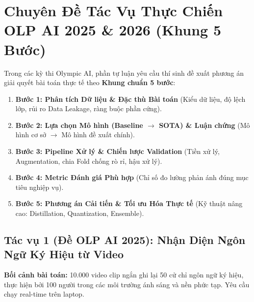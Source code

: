 \documentclass[10pt,a4paper]{article}
\begin{document}
\section{Chuyên Đề Tác Vụ Thực Chiến OLP AI 2025 \& 2026 (Khung 5 Bước)}

Trong các kỳ thi Olympic AI, phần tự luận yêu cầu thí sinh đề xuất phương án giải quyết bài toán thực tế theo \textbf{Khung chuẩn 5 bước}:
\begin{enumerate}[leftmargin=*]
    \item \textbf{Bước 1: Phân tích Dữ liệu \& Đặc thù Bài toán} (Kiểu dữ liệu, độ lệch lớp, rủi ro Data Leakage, ràng buộc phần cứng).
    \item \textbf{Bước 2: Lựa chọn Mô hình (Baseline $\to$ SOTA) \& Luận chứng} (Mô hình cơ sở $\to$ Mô hình đề xuất chính).
    \item \textbf{Bước 3: Pipeline Xử lý \& Chiến lược Validation} (Tiền xử lý, Augmentation, chia Fold chống rò rỉ, hậu xử lý).
    \item \textbf{Bước 4: Metric Đánh giá Phù hợp} (Chỉ số đo lường phản ánh đúng mục tiêu nghiệp vụ).
    \item \textbf{Bước 5: Phương án Cải tiến \& Tối ưu Hóa Thực tế} (Kỹ thuật nâng cao: Distillation, Quantization, Ensemble).
\end{enumerate}

\subsection{Tác vụ 1 (Đề OLP AI 2025): Nhận Diện Ngôn Ngữ Ký Hiệu từ Video}
\textbf{Bối cảnh bài toán:} 10.000 video clip ngắn ghi lại 50 cử chỉ ngôn ngữ ký hiệu, thực hiện bởi 100 người trong các môi trường ánh sáng và nền phức tạp. Yêu cầu chạy real-time trên laptop.
\end{document}
